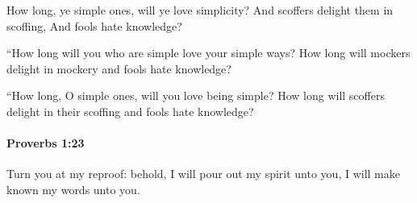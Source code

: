 			\begin{versebox}
					\item[BHS] 
					\item[ASV] How long, ye simple ones, will ye love simplicity? And scoffers delight them in scoffing, And fools hate knowledge?
					\item[NIV] “How long will you who are simple love your simple ways? How long will mockers delight in mockery and fools hate knowledge?
					\item[NRSV] “How long, O simple ones, will you love being simple? How long will scoffers delight in their scoffing and fools hate knowledge?
			\end{versebox}

		\paragraph{Proverbs 1:23} %
			\label{PROVERBS-1-23}

			Turn you at my reproof: behold, I will pour out my spirit unto you, I will make known my words unto you.

